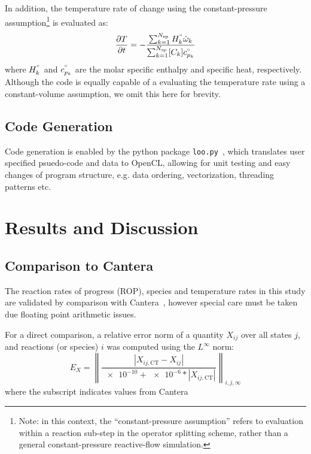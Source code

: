 \documentclass[12pt,number,sort&compress]{elsarticle}
\begin{document}
In addition, the temperature rate of change using the constant-pressure assumption\footnote{Note: in this context, the ``constant-pressure assumption'' refers to evaluation within a reaction sub-step in the operator splitting scheme, rather than a general constant-pressure reactive-flow simulation.} is evaluated as:
\begin{equation}
\frac{\partial T}{\partial t} = -\frac{\sum_{k=1}^{N_{\text{sp}}} H^{\degree}_k \dot{\omega}_k}{\sum_{k=1}^{N_{\text{sp}}} [C_k] c_{p_k}^{\degree}}
\end{equation}
where $H^{\degree}_k$ and $c_{p_k}^{\degree}$ are the molar specific enthalpy and specific heat, respectively.
Although the code is equally capable of a evaluating the temperature rate using a constant-volume assumption, we omit this here for brevity.

\subsection{Code Generation}
Code generation is enabled by the python package \texttt{loo.py}~\cite{kloeckner_loopy_2014}, which translates user specified psuedo-code and data to OpenCL, allowing for unit testing and easy changes of program structure, e.g. data ordering, vectorization, threading patterns etc.

\section{Results and Discussion}
\subsection{Comparison to Cantera}
The reaction rates of progress (ROP), species and temperature rates in this study are validated by comparison with Cantera~\cite{Cantera}, however special care must be taken due floating point arithmetic issues.

For a direct comparison, a relative error norm of a quantity $X_{ij}$ over all states $j$, and reactions (or species) $i$ was computed using the $L^{\infty}$ norm:
\begin{equation}
E_{X} = \left\lVert \frac{\left\lvert X_{ij,\text{CT}} - X_{ij}\right\rvert}{\num{e-10} + \num{e-6} * \left\lvert X_{ij,\text{CT}} \right\rvert} \right\rVert_{i,j,\infty}
\label{e:rel_err}
\end{equation}
where the  subscript indicates values from Cantera~\cite{Cantera}
\end{document}
